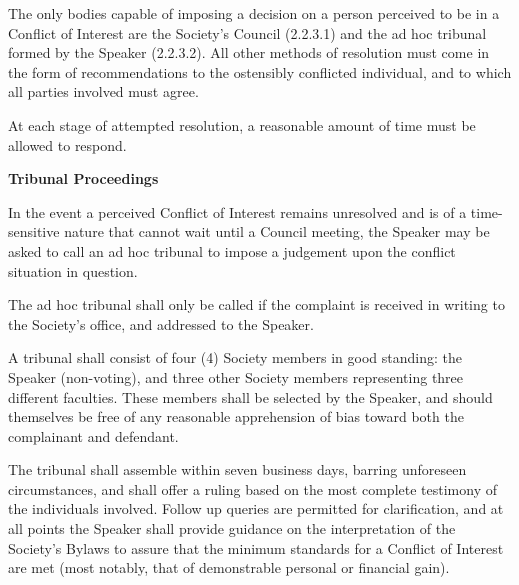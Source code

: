 \begin{longenum}[ label*=\arabic*., align=left]
\begin{longenum}[ label*=\arabic*., align=left]
\begin{longenum}[ label*=\arabic*., align=left]
		\end{longenum}
		\item The only bodies capable of imposing a decision on a person perceived to be in a Conflict of Interest are the Society's Council (2.2.3.1) and the ad hoc tribunal formed by the Speaker (2.2.3.2). All other methods of resolution must come in the form of recommendations to the ostensibly conflicted individual, and to which all parties involved must agree.
        \item At each stage of attempted resolution, a reasonable amount of time must be allowed to respond.
	\end{longenum}
	\item \textbf{Tribunal Proceedings}
	\begin{longenum}[ label*=\arabic*., align=left]
		\item In the event a perceived Conflict of Interest remains unresolved and is of a time-sensitive nature that cannot wait until a Council meeting, the Speaker may be asked to call an ad hoc tribunal to impose a judgement upon the conflict situation in question.
        \item The ad hoc tribunal shall only be called if the complaint is received in writing to the Society's office, and addressed to the Speaker.

        \item A tribunal shall consist of four (4) Society members in good standing: the Speaker (non-voting), and three other Society members representing three different faculties. These members shall be selected by the Speaker, and should themselves be free of any reasonable apprehension of bias toward both the complainant and defendant.

        \item The tribunal shall assemble within seven business days, barring unforeseen circumstances, and shall offer a ruling based on the most complete testimony of the individuals involved. Follow up queries are permitted for clarification, and at all points the Speaker shall provide guidance on the interpretation of the Society's Bylaws to assure that the minimum standards for a Conflict of Interest are met (most notably, that of demonstrable personal or financial gain).



\end{longenum}
\end{longenum}
